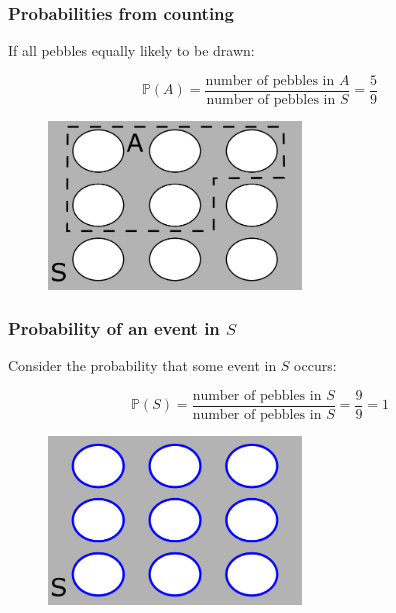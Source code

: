 \documentclass{beamer}
\begin{document}
	\begin{frame}
		\frametitle{Probabilities from counting}
		
		If all pebbles equally likely to be drawn:
		
		 \begin{equation}
		 	\mathbb{P}(A) = \frac{\text{number of pebbles in } A}{\text{number of pebbles in } S} = \frac{5}{9}
		 \end{equation}
	 
	 \begin{figure}[ht]
	 	\centerline{\includegraphics[width=0.6\textwidth]{./figures/pebble_world_proba.png}}
	 \end{figure}
		
	\end{frame}

	\begin{frame}
		\frametitle{Probability of an event in $S$}
		
		Consider the probability that some event in $S$ occurs:
		
		\begin{equation}
			\mathbb{P}(S) = \frac{\text{number of pebbles in } S}{\text{number of pebbles in } S} = \frac{9}{9} = 1
		\end{equation}
		
		\begin{figure}[ht]
			\centerline{\includegraphics[width=0.6\textwidth]{./figures/pebble_world_probs.png}}
		\end{figure}
		
	\end{frame}
\end{document}
